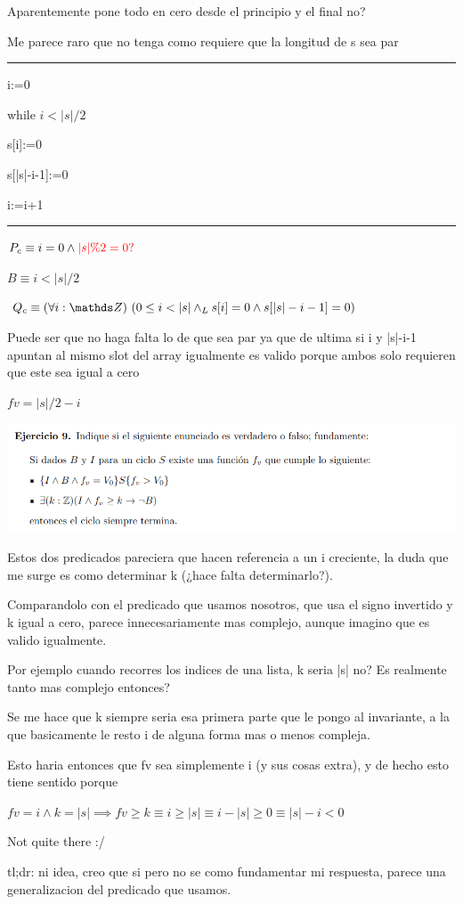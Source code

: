 \documentclass[a4paper,10pt]{article}
\begin{document}
    Aparentemente pone todo en cero desde el principio y el final no?

    Me parece raro que no tenga como requiere que la longitud de s sea par

    \rule{\textwidth}{0.5pt}

    i:=0

    while $i<|s|/2$

    \hspace*{3em}s[i]:=0

    \hspace*{3em}s[|s|-i-1]:=0

    \hspace*{3em}i:=i+1

    \rule{\textwidth}{0.5pt}

$P_c\equiv i=0 \land {\color{red}|s|\%2=0?}$

$B\equiv i<|s|/2$

$Q_c\equiv \paraTodo[unalinea]{i}{\ent}{0\leq i < |s| \land_L s[i]=0\land s[|s|-i-1]=0} $

    {\color{red}Puede ser que no haga falta lo de que sea par ya que de ultima si i y |s|-i-1 apuntan al mismo slot del array igualmente es valido porque ambos solo requieren que este sea igual a cero}

$fv=|s|/2 -i$

    \includegraphics*[width=\textwidth]{e9.png}
    {
        Estos dos predicados pareciera que hacen referencia a un i creciente, la duda que me surge es como determinar k (¿hace falta determinarlo?).

        Comparandolo con el predicado que usamos nosotros, que usa el signo invertido y k igual a cero, parece innecesariamente mas complejo, aunque imagino que es valido igualmente.

        Por ejemplo cuando recorres los indices de una lista, k seria |s| no? Es realmente tanto mas complejo entonces?

        Se me hace que k siempre seria esa primera parte que le pongo al invariante, a la que basicamente le resto i de alguna forma mas o menos compleja.

        Esto haria entonces que fv sea simplemente i (y sus cosas extra), y de hecho esto tiene sentido porque

        $fv=i\land k=|s| \implies fv\geq k \equiv i\geq |s| \equiv i-|s|\geq 0 \equiv |s|-i<0$

        Not quite there :/

        tl;dr: ni idea, creo que si pero no se como fundamentar mi respuesta, parece una generalizacion del predicado que usamos.
    }
\end{document}
